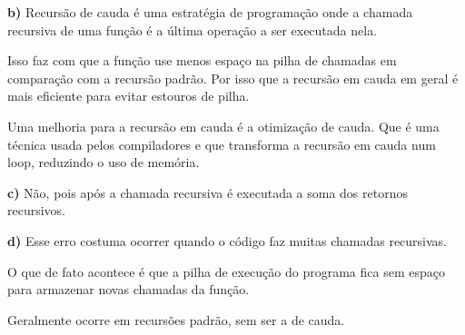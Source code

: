 {\bfseries{b)}} Recursão de cauda é uma estratégia de programação onde a chamada recursiva de uma função é a última operação a ser executada nela.

Isso faz com que a função use menos espaço na pilha de chamadas em comparação com a recursão padrão. Por isso que a recursão em cauda em geral é mais eficiente para evitar estouros de pilha.

Uma melhoria para a recursão em cauda é a otimização de cauda. Que é uma técnica usada pelos compiladores e que transforma a recursão em cauda num loop, reduzindo o uso de memória.

{\bfseries{c)}} Não, pois após a chamada recursiva é executada a soma dos retornos recursivos.

{\bfseries{d)}} Esse erro costuma ocorrer quando o código faz muitas chamadas recursivas.

O que de fato acontece é que a pilha de execução do programa fica sem espaço para armazenar novas chamadas da função.

Geralmente ocorre em recursões padrão, sem ser a de cauda. 